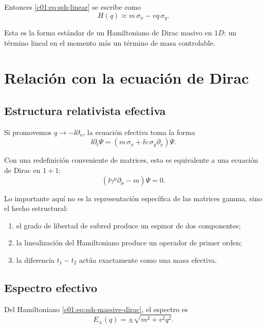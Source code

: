 Entonces \eqref{c01:eq:ssh-linear} se escribe como
\begin{equation}
H(q)\approx m\,\sigma_x - v q\,\sigma_y.
\label{c01:eq:ssh-massive-dirac}
\end{equation}

Esta es la forma estándar de un Hamiltoniano de Dirac masivo en \(1D\): un término lineal en el momento más un término de masa controlable.

\section{Relación con la ecuación de Dirac}

\subsection{Estructura relativista efectiva}

Si promovemos \(q\to -\ii \partial_x\), la ecuación efectiva toma la forma
\begin{equation}
\ii \partial_t \Psi =
\left(
m\,\sigma_x + \ii v\,\sigma_y \partial_x
\right)\Psi.
\label{c01:eq:ssh-dirac-real}
\end{equation}

Con una redefinición conveniente de matrices, esto es equivalente a una ecuación de Dirac en \(1+1\):
\begin{equation}
\left(
\ii \gamma^\mu \partial_\mu - m
\right)\Psi=0.
\end{equation}

Lo importante aquí no es la representación específica de las matrices gamma, sino el hecho estructural:

\begin{enumerate}[leftmargin=*]
  \item el grado de libertad de subred produce un espinor de dos componentes;
  \item la linealización del Hamiltoniano produce un operador de primer orden;
  \item la diferencia \(t_1-t_2\) actúa exactamente como una masa efectiva.
\end{enumerate}

\subsection{Espectro efectivo}

Del Hamiltoniano \eqref{c01:eq:ssh-massive-dirac}, el espectro es
\begin{equation}
E_\pm(q)=\pm \sqrt{m^2+v^2 q^2}.
\label{c01:eq:ssh-effective-disp}
\end{equation}

